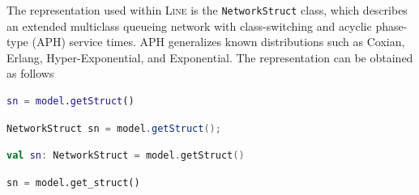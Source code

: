 The representation used within \textsc{Line} is the \texttt{NetworkStruct} class, which describes an extended multiclass queueing network with class-switching and acyclic phase-type (APH) service times. APH generalizes known distributions such as Coxian, Erlang, Hyper-Exponential, and Exponential. The representation can be obtained as follows
\begin{MATLAB}    
\begin{lstlisting}[language = matlab]
sn = model.getStruct()
\end{lstlisting}
\end{MATLAB}
\begin{JAVA}
\begin{lstlisting}[language = java, basicstyle=\ttfamily\scriptsize]
NetworkStruct sn = model.getStruct();
\end{lstlisting}
\end{JAVA}
\begin{KOTLIN}
\begin{lstlisting}[language = kotlin, basicstyle=\ttfamily\scriptsize]
val sn: NetworkStruct = model.getStruct()
\end{lstlisting}
\end{KOTLIN}
\begin{PYTHON}
\begin{lstlisting}[language = python]
sn = model.get_struct()
\end{lstlisting}    
\end{PYTHON}

